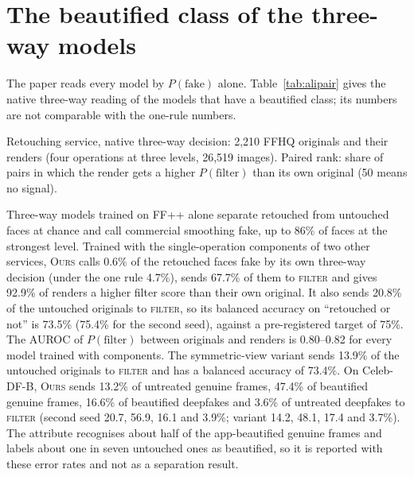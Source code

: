 \documentclass[10pt]{article}
\newcommand{\ours}{\textsc{Ours}}
\begin{document}
\section{The beautified class of the three-way models}
\label{sec:native}
The paper reads every model by $P(\text{fake})$ alone. Table~\ref{tab:alipair} gives the native three-way reading of the models that
have a beautified class; its numbers are not comparable with the one-rule numbers.
\begin{table}[H]
\centering
\caption{Retouching service, native three-way decision: 2,210 FFHQ originals and their renders (four operations at three levels,
26,519 images). Paired rank: share of pairs in which the render gets a higher $P(\text{filter})$ than its own original (50 means no
signal).}
\label{tab:alipair}
\footnotesize
\begin{adjustbox}{max width=\linewidth}\end{adjustbox}
\end{table}
Three-way models trained on FF++ alone separate retouched from untouched faces at chance and call commercial smoothing fake, up to 86\%
of faces at the strongest level. Trained with the single-operation components of two other services, \ours{} calls 0.6\% of the
retouched faces fake by its own three-way decision (under the one rule 4.7\%), sends 67.7\% of them to \textsc{filter} and gives 92.9\%
of renders a higher filter score than their own original. It also sends 20.8\% of the untouched originals to \textsc{filter}, so its
balanced accuracy on ``retouched or not'' is 73.5\% (75.4\% for the second seed), against a pre-registered target of 75\%. The AUROC
of $P(\text{filter})$ between originals and renders is 0.80--0.82 for every model trained with components. The symmetric-view variant
sends 13.9\% of the untouched originals to \textsc{filter} and has a balanced accuracy of 73.4\%. On Celeb-DF-B, \ours{} sends 13.2\%
of untreated genuine frames, 47.4\% of beautified genuine frames, 16.6\% of beautified deepfakes and 3.6\% of untreated deepfakes to
\textsc{filter} (second seed 20.7, 56.9, 16.1 and 3.9\%; variant 14.2, 48.1, 17.4 and 3.7\%). The attribute recognises about half of
the app-beautified genuine frames and labels about one in seven untouched ones as beautified, so it is reported with these error
rates and not as a separation result.
\end{document}
